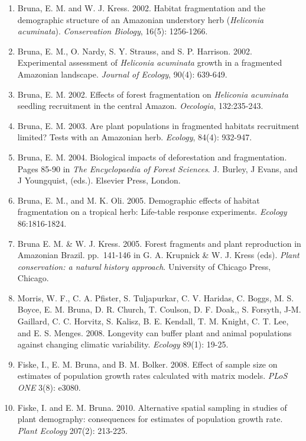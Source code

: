 \documentclass[
  12pt,
  man, donotrepeattitle]{apa6}
\begin{document}
\begin{enumerate}
\def\labelenumi{\arabic{enumi}.}
\item
  Bruna, E. M. and W. J. Kress. 2002. Habitat fragmentation and the demographic structure of an Amazonian understory herb (\emph{Heliconia acuminata}). \emph{Conservation Biology}, 16(5): 1256-1266.
\item
  Bruna, E. M., O. Nardy, S. Y. Strauss, and S. P. Harrison. 2002. Experimental assessment of \emph{Heliconia acuminata} growth in a fragmented Amazonian landscape. \emph{Journal of Ecology}, 90(4): 639-649.
\item
  Bruna, E. M. 2002. Effects of forest fragmentation on \emph{Heliconia acuminata} seedling recruitment in the central Amazon. \emph{Oecologia}, 132:235-243.
\item
  Bruna, E. M. 2003. Are plant populations in fragmented habitats recruitment limited? Tests with an Amazonian herb. \emph{Ecology}, 84(4): 932-947.
\item
  Bruna, E. M. 2004. Biological impacts of deforestation and fragmentation. Pages 85-90 in \emph{The Encyclopaedia of Forest Sciences}. J. Burley, J Evans, and J Youngquist, (eds.). Elsevier Press, London.
\item
  Bruna, E. M., and M. K. Oli. 2005. Demographic effects of habitat fragmentation on a tropical herb: Life-table response experiments. \emph{Ecology} 86:1816-1824.
\item
  Bruna E. M. \& W. J. Kress. 2005. Forest fragments and plant reproduction in Amazonian Brazil. pp.~141-146 in G. A. Krupnick \& W. J. Kress (eds). \emph{Plant conservation: a natural history approach}. University of Chicago Press, Chicago.
\item
  Morris, W. F., C. A. Pfister, S. Tuljapurkar, C. V. Haridas, C. Boggs, M. S. Boyce, E. M. Bruna, D. R. Church, T. Coulson, D. F. Doak,, S. Forsyth, J-M. Gaillard, C. C. Horvitz, S. Kalisz, B. E. Kendall, T. M. Knight, C. T. Lee, and E. S. Menges. 2008. Longevity can buffer plant and animal populations against changing climatic variability. \emph{Ecology} 89(1): 19-25.
\item
  Fiske, I., E. M. Bruna, and B. M. Bolker. 2008. Effect of sample size on estimates of population growth rates calculated with matrix models. \emph{PLoS ONE} 3(8): e3080.
\item
  Fiske, I. and E. M. Bruna. 2010. Alternative spatial sampling in studies of plant demography: consequences for estimates of population growth rate. \emph{Plant Ecology} 207(2): 213-225.

\end{enumerate}
\end{document}
